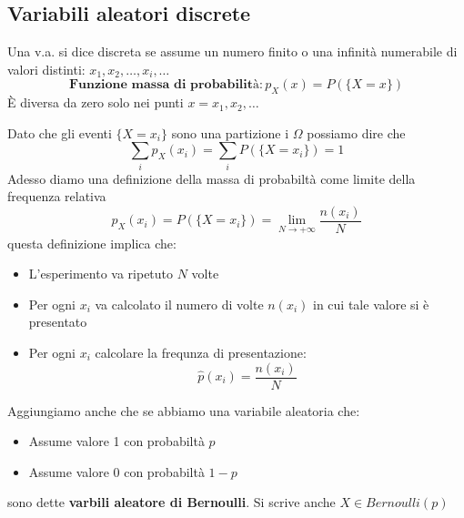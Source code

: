 \documentclass[11pt,a4paper]{article}
\begin{document}
\subsection{Variabili aleatori discrete}\label{sub:Variabili aleatori discrete} %
\begin{importantbox}
    Una v.a. si dice discreta se assume un numero finito
    o una infinità numerabile di valori distinti: $x_1, x_2, \dots ,x_i, \dots$ 
    \[
        \textbf{Funzione massa di probabilità}: p_X(x) = P(\{X = x\}) 
    \]
    È diversa da zero solo nei punti $x = x_1, x_2, \dots$
\end{importantbox}
Dato che gli eventi $\{X = x_i\}$ sono una partizione i $\Omega$ possiamo dire che 
\[
    \sum_i p_X(x_i) = \sum_i P(\{X = x_i\}) = 1
\]
Adesso diamo una definizione della massa di probabiltà come limite della frequenza
relativa
\[
    p_X(x_i) = P(\{X = x_i\}) = \lim_{N \to +\infty} \frac{n(x_i)}{N}
\]
questa definizione implica che:
\begin{itemize}
    \item L'esperimento va ripetuto $N$ volte
    \item Per ogni $x_i$ va  calcolato il numero di volte $n(x_i)$ in cui tale valore si è presentato
    \item Per ogni $x_i$ calcolare la frequnza di presentazione:
        \[
            \hat p(x_i) = \frac{n(x_i)}{N}
        \]
\end{itemize}
Aggiungiamo anche che se abbiamo una variabile aleatoria che:
\begin{itemize}
    \item Assume valore 1 con probabiltà $p$
    \item Assume valore 0 con probabiltà $1 - p$
\end{itemize}
sono dette \textbf{varbili aleatore di Bernoulli}. Si scrive anche $X \in \textit{Bernoulli}(p)$
\end{document}
